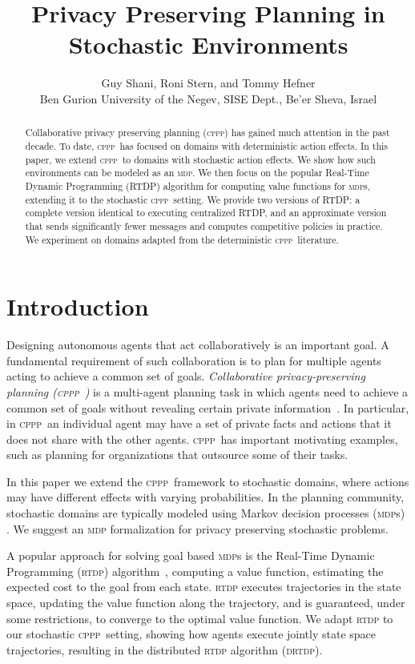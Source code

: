\documentclass[letterpaper]{article} %
\title{Privacy Preserving Planning in Stochastic Environments}
\author{Guy Shani, Roni Stern, and Tommy Hefner\\
Ben Gurion University of the Negev, SISE Dept., Be’er Sheva, Israel}
\newcommand{\cppp}{\textsc {cppp}\xspace}
\newcommand{\rtdp}{\textsc {rtdp}\xspace}
\newcommand{\drtdp}{\textsc {drtdp}\xspace}
\newcommand{\mdps}{\textsc {mdp}s\xspace}
\newcommand{\mdp}{\textsc {mdp}\xspace}
\theoremstyle{remark}
\newcommand{\citep}[1]{\cite{#1}}
\begin{document}
\maketitle

\begin{abstract}

Collaborative privacy preserving planning (\cppp) has gained much attention in the past decade. To date, \cppp\ has focused on domains with deterministic action effects. In this paper, we extend \cppp\ to domains with stochastic action effects. We show how such environments can be modeled as an \mdp. We then focus on the popular Real-Time Dynamic Programming (RTDP) algorithm for computing value functions for \mdps, extending it to the stochastic \cppp\ setting. We provide two versions of RTDP: a complete version identical to executing centralized RTDP, and an approximate version that sends significantly fewer messages and computes competitive policies in practice. We experiment on domains adapted from the deterministic \cppp\ literature.
\end{abstract}



\section{Introduction}

Designing autonomous agents that act collaboratively is an important goal. A fundamental requirement of such collaboration is to plan for multiple agents acting to achieve a common set of goals.  \emph{Collaborative privacy-preserving planning (\cppp\ )} is a multi-agent planning task in which agents need to achieve a common set of goals without revealing certain private information~\citep{brafman2008one}. In particular, in \cppp\  an individual agent may have a set of private facts and actions that it does not share with the other agents. \cppp\  has important motivating examples, such as planning for organizations that outsource some of their tasks.

In this paper we extend the \cppp\ framework to stochastic domains, where actions may have different effects with varying probabilities. In the planning community, stochastic domains are typically modeled using Markov decision processes (\mdps) \cite[e.g.]{kolobov2012planning}. We suggest an \mdp formalization for privacy preserving stochastic problems.

A popular approach for solving goal based \mdps is the Real-Time Dynamic Programming (\rtdp) algorithm~\cite{barto1995learning}, computing a value function, estimating the expected cost to the goal from each state. \rtdp executes trajectories in the state space, updating the value function along the trajectory, and is guaranteed, under some restrictions, to converge to the optimal value function. We adapt \rtdp to our stochastic \cppp\ setting, showing how agents execute jointly state space trajectories, resulting in the distributed \rtdp algorithm (\drtdp).
\end{document}
